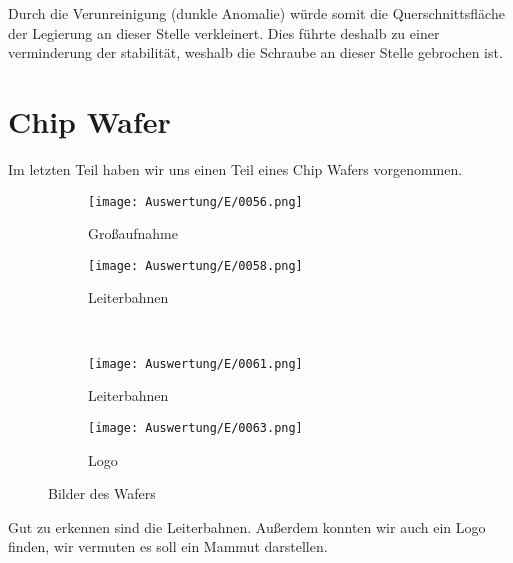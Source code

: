 Durch die Verunreinigung (dunkle Anomalie) würde somit die Querschnittsfläche der Legierung an dieser Stelle verkleinert. Dies führte deshalb zu einer verminderung der stabilität, weshalb die Schraube an dieser Stelle gebrochen ist.

\newpage
\section{Chip Wafer}

Im letzten Teil haben wir uns einen Teil eines Chip Wafers vorgenommen.

\begin{figure}[h]
    \centering
    
    \begin{subfigure}[b]{0.45\textwidth}
        \centering
        \texttt{[image: Auswertung/E/0056.png]}
        \caption{Großaufnahme}
    \end{subfigure}
    \hfill
    \begin{subfigure}[b]{0.45\textwidth}
        \centering
        \texttt{[image: Auswertung/E/0058.png]}
        \caption{Leiterbahnen}
    \end{subfigure}
    \\
    \begin{subfigure}[b]{0.45\textwidth}
        \centering
        \texttt{[image: Auswertung/E/0061.png]}
        \caption{Leiterbahnen}
    \end{subfigure}
    \hfill
    \begin{subfigure}[b]{0.45\textwidth}
        \centering
        \texttt{[image: Auswertung/E/0063.png]}
        \caption{Logo}
    \end{subfigure}
    \caption{Bilder des Wafers}
\end{figure}
Gut zu erkennen sind die Leiterbahnen. Außerdem konnten wir auch ein Logo finden, wir vermuten es soll ein Mammut darstellen.